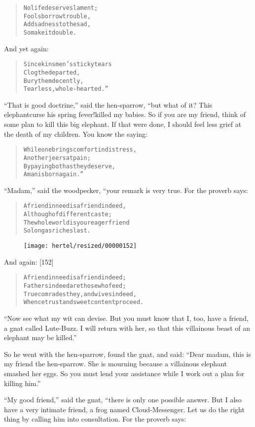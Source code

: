 \documentclass[article, twoside, 10pt]{memoir}
\renewenvironment{verbatim}{%
\begin{quote}%
\vskip -10pt%
\begin{alltt}\normalfont\small}{\end{alltt}%
\end{quote}%
\vskip -10pt
} %
\begin{document}
\begin{verbatim}
No life deserves lament;
    Fools borrow trouble,
Add sadness to the sad,
    So make it double.
\end{verbatim}
And yet again:

\begin{verbatim}
Since kinsmen's sticky tears
    Clog the departed,
Bury them decently,
    Tearless, whole-hearted.”
\end{verbatim}
``That is good doctrine,'' said the hen-sparrow, “but what of it?
This elephant{\textemdash}curse his spring fever!{\textemdash}killed my babies. So if
you are my friend, think of some plan to kill this big elephant. If
that were done, I should feel less grief at the death of my
children. You know the saying:

\begin{verbatim}
While one brings comfort in distress,
    Another jeers at pain;
By paying both as they deserve,
    A man is born again.”
\end{verbatim}
``Madam,'' said the woodpecker, “your remark is very true. For the
proverb says:

\begin{verbatim}
A friend in need is a friend indeed,
    Although of different caste;
The whole world is your eager friend
    So long as riches last.
\end{verbatim}
\begin{figure}[p]\texttt{[image: hertel/resized/00000152]}\end{figure}And again: [152]

\begin{verbatim}
A friend in need is a friend indeed;
Fathers indeed are those who feed;
True comrades they, and wives indeed,
Whence trust and sweet content proceed.
\end{verbatim}
``Now see what my wit can devise. But you must know that I, too, have a friend, a gnat called Lute-Buzz. I will return with her, so that this villainous beast of an elephant may be killed.''

So he went with the hen-sparrow, found the gnat, and said:
``Dear madam, this is my friend the hen-sparrow. She is mourning because a villainous elephant smashed her eggs. So you must lend your assistance while I work out a plan for killing him.''

``My good friend,'' said the gnat, “there is only one possible
answer. But I also have a very intimate friend, a frog named
Cloud-Messenger. Let us do the right thing by calling him into
consultation. For the proverb says:
\end{document}
